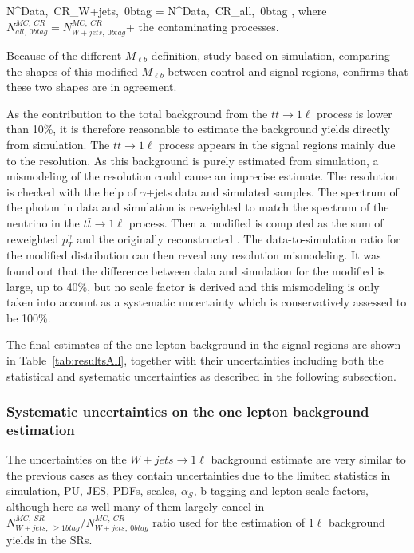 {
N^{Data,~CR}_{W+jets,~0btag} = N^{Data,~CR}_{all,~0btag} \times {} ,
}
where $ N^{MC,~CR}_{all,~0btag} = N^{MC,~CR}_{W+jets,~0btag}$+ the contaminating processes.

Because of the different $M_{\ell b}$ definition, study based on simulation, comparing the shapes of this modified $M_{\ell b}$ between control and signal regions, confirms that these two shapes are in agreement. 

As the contribution to the total background from the $t\bar{t} \to 1\ell$ process is lower than 10\%, it is therefore reasonable to estimate the background yields directly from simulation. The $t\bar{t} \to 1\ell$ process appears in the signal regions mainly due to the \MET resolution. As this background is purely estimated from simulation, a mismodeling of the \MET resolution could cause an imprecise estimate. The \MET resolution is checked with the help of $\gamma$+jets data and simulated samples. The \pt spectrum of the photon in data and simulation is reweighted to match the \pt spectrum of the neutrino in the $t\bar{t} \to 1\ell$ process. Then a modified \MET is computed as the sum of reweighted $p_{T}^{\gamma}$ and the originally reconstructed \MET. The data-to-simulation ratio for the modified \MET distribution can then reveal any \MET resolution mismodeling. It was found out that the difference between data and simulation for the modified \MET is large, up to 40\%, but no scale factor is derived and this mismodeling is only taken into account as a systematic uncertainty which is conservatively assessed to be 100\%. %
 
The final estimates of the one lepton background in the signal regions are shown in Table~\ref{tab:resultsAll}, together with their uncertainties including both the statistical and systematic uncertainties as described in the following subsection.

\subsubsection{Systematic uncertainties on the one lepton background estimation}

The uncertainties on the $W+jets \to 1\ell$  background estimate are very similar to the previous cases as they contain uncertainties due to the limited statistics in simulation, PU, JES, PDFs, scales, $\alpha_{S}$, b-tagging and lepton scale factors, although here as well many of them largely cancel in $N^{MC,~SR}_{W+jets,~\geq 1btag}/ N^{MC,~CR}_{W+jets,~0btag}$ ratio used for the estimation of $1\ell$ background yields in the SRs.

